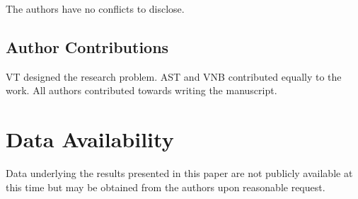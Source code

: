 \documentclass[%
aip,
amsmath,amssymb,
preprint,%
]{revtex4-2}
\begin{document}
The authors have no conflicts to disclose.

\subsection*{Author Contributions}
VT designed the research problem. AST and VNB contributed equally to the work. All authors contributed towards writing the manuscript.

\section*{Data Availability}

Data underlying the results presented in this paper are not publicly available at this time but may be obtained from the authors upon reasonable request.


\end{document}
